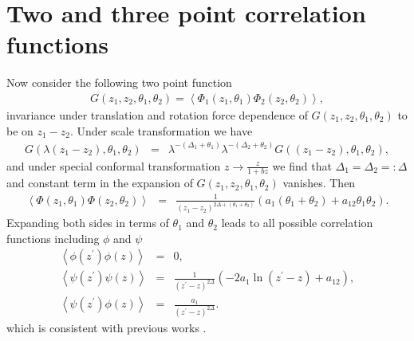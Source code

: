\documentclass[a4paper,11pt]{article}
\begin{document}
\section{Two and three point correlation functions}
Now consider the following two point function
\begin{eqnarray}\label{eq:a5}
G(z_{1},z_{2},\theta_{1},\theta_{2})=
\left<\Phi_{1}(z_{1},\theta_{1})\Phi_{2}(z_{2},\theta_{2})\right>,
\end{eqnarray}
invariance under translation and rotation force dependence of
$G(z_{1},z_{2},\theta_{1},\theta_{2})$ to be on $z_{1}-z_{2}$.
Under scale transformation we have
\begin{eqnarray}\label{eq:a6}
G(\lambda(z_{1}-z_{2}),\theta_{1},\theta_{2})&=&
\lambda^{-(\Delta_{1}+\theta_{1})}\lambda^{-(\Delta_{2}+
\theta_{2})}G((z_{1}-z_{2}),\theta_{1},\theta_{2}) ,
\end{eqnarray}
and under special conformal transformation
$z\longrightarrow\frac{z}{1+bz}$ we find that
$\Delta_{1}=\Delta_{2}=:\Delta$ and constant term in the
expansion of $G(z_{1},z_{2},\theta_{1},\theta_{2})$ vanishes. Then
\begin{eqnarray}\label{eq:a7}
\left<\Phi(z_{1},\theta_{1})\Phi(z_{2},\theta_{2})\right>&=&
\frac{1} {(z_{1}-z_{2})^{2\Delta+(\theta_{1}+\theta_{2})}}
(a_{1}(\theta_{1}+\theta_{2})+a_{12}\theta_{1}\theta_{2}).
\end{eqnarray}
Expanding both sides in terms of $\theta_{1}$ and $\theta_{2}$
leads to all possible correlation functions including $\phi$ and
$\psi$
\begin{eqnarray}\label{eq:a8}
\left<\phi(z^{\prime})\phi(z)\right>&=&0 ,\nonumber\\
\left<\psi(z^{\prime})\psi(z)\right>&=
&\frac{1}{(z^{\prime}-z)^{2\Delta}}(-2a_{1}\ln(z^{\prime}-z)+a_{12}) ,\nonumber\\
\left<\psi(z^{\prime})\phi(z)\right>&=&\frac{a_{1}}{(z^{\prime}-z)^{2\Delta}}
.
\end{eqnarray}
which is consistent with previous works \cite{cau}.
\end{document}
